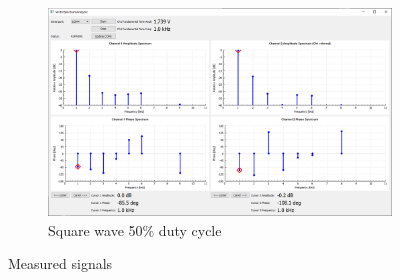 \documentclass[notitlepage, a4paper, 11pt]{article}
\begin{document}
\begin{figure}[H]
\begin{subfigure}[][][t]{0.45\textwidth}
			\includegraphics[width=\textwidth, trim=10 80 10 100, clip]{../img/Circuit1/trig40}
			\caption{Square wave 50\% duty cycle}
		\end{subfigure}
		\caption{Measured signals}
	\end{figure}
	
\end{document}
